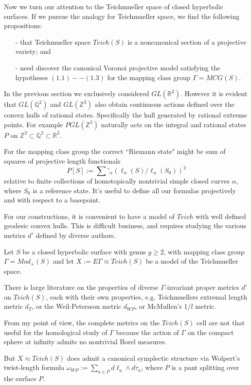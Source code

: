 \documentclass[12pt]{article}
\theoremstyle{definition}
\theoremstyle{remark}
\newcommand{\bR}{\mathbb{R}}
\newcommand{\bZ}{\mathbb{Z}}
\newcommand{\bQ}{\mathbb{Q}}
\begin{document}
Now we turn our attention to the Teichmueller space of closed hyperbolic surfaces. If we pursue the analogy for Teichmueller space, we find the following propositions:
\begin{itemize}
\item[-] that Teichmueller space $Teich(S)$ is a noncanonical section of a projective variety; and
\item[-] need discover the canonical Voronoi projective model satisfying the hypotheses $(1.1)--(1.3)$ for the mapping class group $\Gamma = MCG(S)$. 
\end{itemize} 

In the previous section we exclusively considered $GL(\bR^2)$. However it is evident that $GL(\bQ^2)$ and $GL(\bZ^2)$ also obtain continuous actions defined over the convex hulls of rational states. Specifically the hull generated by rational extreme points. For example $PGL(\bZ^2)$ naturally acts on the integral and rational states $P$ on $\bZ^2 \subset \bQ^2 \subset \bR^2$. 

For the mapping class group the correct ``Riemann state" might be sum of squares of projective length functionals $$P[S]:=\sum'_{\alpha}  (\ell_\alpha (S)/\ell_\alpha(S_0))^2$$ relative to finite collections of homotopically nontrivial simple closed curves $\alpha$, where $S_0$ is a reference state. It's useful to define all our formulas projectively and with respect to a basepoint.  

For our constructions, it is convenient to have a model of $Teich$ with well defined geodesic convex hulls. This is difficult business, and requires studying the various metrics $d'$ defined by diverse authors. 

Let $S$ be a closed hyperbolic surface with genus $g\geq 2$, with mapping class group $\Gamma=Mod_+(S)$ and let $X:=E\Gamma \approx Teich(S)$ be a model of the Teichmueller space. 

There is large literature on the properties of diverse $\Gamma$-invariant proper metrics $d'$ on $Teich(S)$, each with their own properties, e.g. Teichmuellers extremal length metric $d_{T}$, or the Weil-Petersson metric $d_{WP}$, or McMullen's $1/l$ metric. 

From my point of view, the complete metrics on the $Teich(S)$ cell are not that useful for the homological study of $\Gamma$ because the action of $\Gamma$ on the compact sphere at infinity admits no nontrivial Borel measures. 

But $X\approx Teich(S)$ does admit a canonical symplectic structure via Wolpert's twist-length formula $\omega_{WP}:=\sum_{a\in P} d\ell_a \wedge d\tau_a$, where $P$ is a pant splitting over the surface $P$. 
\end{document}
